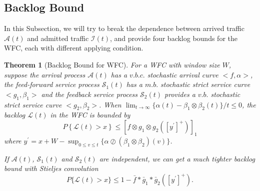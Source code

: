 \documentclass[12pt]{article}
\newtheorem{theorem}{Theorem}
\begin{document}
\subsection{Backlog Bound}\label{backlog}
In this Subsection, we will try to break the dependence between arrived traffic $\mathcal{A}(t)$ and admitted traffic $\mathcal{I}(t)$, and provide four backlog bounds for the WFC, each with different applying condition.
\begin{theorem}[Backlog Bound for WFC]\label{theorem1}
For a WFC with window size $W$, suppose the arrival process $\mathcal{A}(t)$ has a $v.b.c.$ stochastic arrival curve $<f,\alpha>$, the feed-forward service process $\mathcal{S}_1(t)$ has a $m.b.$ stochastic strict service curve $<g_1,\beta_1>$ and the feedback service process $\mathcal{S}_2(t)$ provides a $v.b.$ stochastic strict service curve $<g_2,\beta_2>$. When $\lim_{t\to\infty}\{\alpha(t)-\beta_1\otimes\beta_2(t)\}/t\leq 0$, the backlog $\mathcal{L}(t)$ in the WFC is bounded by
\begin{equation}\label{eqn1}
P\left\{\mathcal{L}(t)>x\right\}\leq [f\otimes g_1\otimes g_2([y^\prime]^+)]_1
\end{equation}
where $y^\prime=x+W-\sup_{0\leq v\leq t}\{\alpha\oslash(\beta_1\otimes\beta_2)(v)\}$.

If $\mathcal{A}(t)$, $\mathcal{S}_1(t)$ and $\mathcal{S}_2(t)$ are independent, we can get a much tighter backlog bound with Stieljes convolution
\begin{equation}\label{eqn2}
P\{\mathcal{L}(t)>x\}\leq 1-\bar{f}\ast\bar{g}_1\ast\bar{g}_2([y^\prime]^+).
\end{equation}
\end{theorem}
\end{document}
